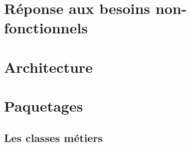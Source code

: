 \section{Réponse aux besoins non-fonctionnels}


\section{Architecture}


\section{Paquetages}


\subsection{Les classes métiers}
\label{section_metiers}


